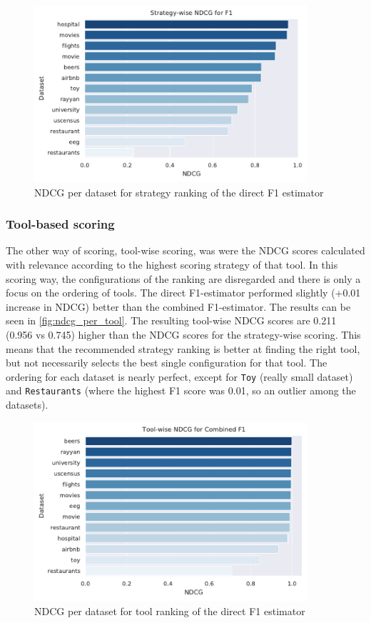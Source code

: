 \begin{figure}[H]
    \centering
    \includegraphics[width=0.9\textwidth]{thesis/Figures/RQ3/15_ranking_ndcg_F1_strategy_wise.pdf}
    \caption{NDCG per dataset for strategy ranking of the direct F1 estimator}
    \label{fig:ndcg_per_strategy}
\end{figure}


\subsubsection{Tool-based scoring}
The other way of scoring, tool-wise scoring, was were the NDCG scores calculated with relevance according to the highest scoring strategy of that tool. In this scoring way, the configurations of the ranking are disregarded and there is only a focus on the ordering of tools. The direct F1-estimator performed slightly (+0.01 increase in NDCG) better than the combined F1-estimator. The results can be seen in \autoref{fig:ndcg_per_tool}. 
The resulting tool-wise NDCG scores are 0.211 (0.956 vs 0.745) higher than the NDCG scores for the strategy-wise scoring. This means that the recommended strategy ranking is better at finding the right tool, but not necessarily selects the best single configuration for that tool. The ordering for each dataset is nearly perfect, except for \verb|Toy| (really small dataset) and \verb|Restaurants| (where the highest F1 score was 0.01, so an outlier among the datasets). 

\begin{figure}[H]
    \centering
    \includegraphics[width=0.9\textwidth]{thesis/Figures/RQ3/15_ranking_ndcg_combined_f1_tool_wise.pdf}
    \caption{NDCG per dataset for tool ranking of the direct F1 estimator}
    \label{fig:ndcg_per_tool}
\end{figure}


